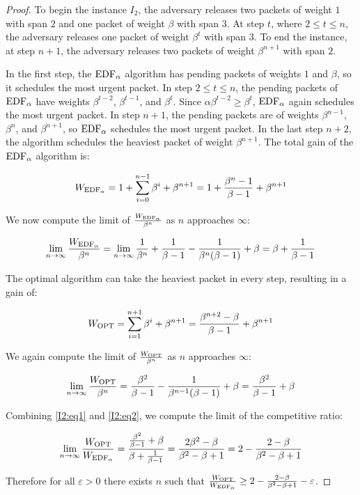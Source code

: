 \begin{proof}
To begin the instance $I_2$, the adversary releases two packets of weight $1$ with
span $2$ and one packet of weight $\beta$ with span $3$. At step $t$, where $2
\leq t \leq n$, the adversary releases one packet of weight $\beta^t$ with span
$3$. To end the instance, at step $n+1$, the adversary releases two packets of weight
$\beta^{n+1}$ with span $2$.

In the first step, the $\text{EDF}_\alpha$ algorithm has pending packets of weights $1$ and
$\beta$, so it schedules the most urgent packet. In step $2 \leq t \leq n$, the
pending packets of $\text{EDF}_\alpha$ have weights $\beta^{t-2}$, $\beta^{t-1}$, and
$\beta^t$. Since $\alpha \beta^{t-2} \geq \beta^t$, $\text{EDF}_\alpha$ again schedules the
most urgent packet. In step $n+1$, the pending packets are of weights
$\beta^{n-1}$, $\beta^n$, and $\beta^{n+1}$, so $\text{EDF}_\alpha$ schedules the most urgent
packet. In the last step $n+2$, the algorithm schedules the heaviest packet of
weight $\beta^{n+1}$. The total gain of the $\text{EDF}_\alpha$ algorithm is:

\[
W_{\text{EDF}_\alpha} = 1 + \sum_{i = 0}^{n-1} {\beta^i} + \beta^{n+1} = 1 + \frac{\beta^n - 1}{\beta-1} + \beta^{n+1}
\]

We now compute the limit of $\frac{W_{\text{EDF}_\alpha}}{\beta^n}$ as $n$ approaches $\infty$:

\begin{equation}\label{I2:eq1}
\lim_{n \to \infty} \frac{W_{\text{EDF}_\alpha}}{\beta^n} = \lim_{n \to \infty}
\frac{1}{\beta^n} + \frac{1}{\beta-1} - \frac{1}{\beta^n(\beta - 1)} + \beta =
\beta + \frac{1}{\beta - 1}
\end{equation}

The optimal algorithm can take the heaviest packet in every step, resulting in a gain of:

\[
W_{\text{OPT}} = \sum_{i = 1}^{n+1} {\beta^i} + \beta^{n+1} = \frac{\beta^{n+2} - \beta}{\beta - 1} + \beta^{n+1}
\]

We again compute the limit of $\frac{W_{\text{OPT}}}{\beta^n}$ as $n$ approaches $\infty$:

\begin{equation}\label{I2:eq2}
\lim_{n \to \infty} \frac{W_{\text{OPT}}}{\beta^n} = \frac{\beta^2}{\beta - 1} - \frac{1}{\beta^{n-1}(\beta - 1)} + \beta = \frac{\beta^2}{\beta - 1} + \beta
\end{equation}

Combining \ref{I2:eq1} and \ref{I2:eq2}, we compute the limit of the competitive
ratio:

\[
\lim_{n \to \infty} \frac{W_{\text{OPT}}}{W_{\text{EDF}_\alpha}} = \frac{\frac{\beta^2}{\beta - 1} + \beta}{\beta + \frac{1}{\beta - 1}}
= \frac{2\beta^2 - \beta}{\beta^2 - \beta + 1}
= 2 - \frac{2 - \beta}{\beta^2 - \beta + 1}
\]

Therefore for all $\varepsilon > 0$ there exists $n$ such that
$\frac{W_{\text{OPT}}}{W_{\text{EDF}_\alpha}} \geq 2 - \frac{2 - \beta}{\beta^2 - \beta + 1} -
\varepsilon$.
\end{proof}

